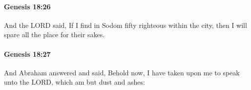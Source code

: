 		\paragraph{Genesis 18:26} %
			\label{GENESIS-18-26}

			And the LORD said, If I find in Sodom fifty righteous within the city, then I will spare all the place for their sakes.


		\paragraph{Genesis 18:27} %
			\label{GENESIS-18-27}

			And Abraham answered and said, Behold now, I have taken upon me to speak unto the LORD, which am but dust and ashes:


